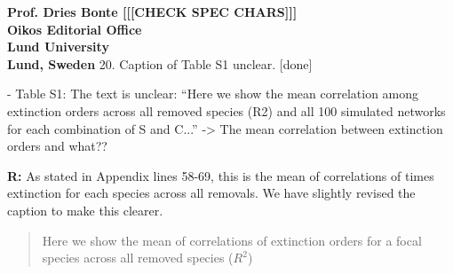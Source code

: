 \documentclass[12pt]{letter}
\begin{document}
\begin{letter}{\bf Prof. Dries Bonte [[[CHECK SPEC CHARS]]]\\
Oikos Editorial Office \\
Lund University \\
Lund, Sweden}
    20. Caption of Table S1 unclear. [done]

      - Table S1: The text is unclear: ``Here we show the mean correlation among
      extinction orders across all removed species (R2) and all 100 simulated networks for each combination of S and C...'' -> The mean correlation between extinction orders and what??


      \textbf{R:} As stated in Appendix lines 58-69, this is the mean of correlations of times extinction for each species across all removals. We have slightly revised the caption to make this clearer.


      \begin{quotation}
        Here we show the mean of correlations of extinction orders for a focal species across all removed species ($R^2$)
      \end{quotation}


\end{letter}
\end{document}
